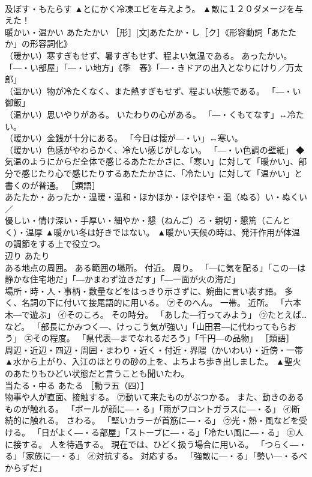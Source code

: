 \documentclass[8pt]{extreport}
\begin{document}
\begin{CJK}{UTF8}{min}
\\	及ぼす・もたらす	▲とにかく冷凍エビを与えよう。 ▲敵に１２０ダメージを与えた！
\\	暖かい・温かい	あたたかい	［形］[文]あたたか・し［ク］《形容動詞「あたたか」の形容詞化》 
\\	（暖かい）寒すぎもせず、暑すぎもせず、程よい気温である。 あったかい。 「―・い部屋」「―・い地方」《季　春》「―・きドアの出入となりにけり／万太郎」 
\\	（温かい）物が冷たくなく、また熱すぎもせず、程よい状態である。 「―・い御飯」 
\\	（温かい）思いやりがある。 いたわりの心がある。 「―・くもてなす」↔冷たい。 
\\	（暖かい）金銭が十分にある。 「今日は懐が―・い」↔寒い。 
\\	（暖かい）色感がやわらかく、冷たい感じがしない。 「―・い色調の壁紙」 ◆気温のようにからだ全体で感じるあたたかさに、「寒い」に対して「暖かい」、部分で感じたり心で感じたりするあたたかさに、「冷たい」に対して「温かい」と書くのが普通。 ［類語］
\\	あたたか・あったか・温暖・温和・ほかほか・ほやほや・温（ぬる）い・ぬくい／
\\	優しい・情け深い・手厚い・細やか・懇（ねんご）ろ・親切・懇篤（こんとく）・温厚	▲暖かい冬は好きではない。 ▲暖かい天候の時は、発汗作用が体温の調節をする上で役立つ。
\\	辺り	あたり	
\\	ある地点の周囲。 ある範囲の場所。 付近。 周り。 「―に気を配る」「この―は静かな住宅地だ」「―かまわず泣きだす」「―一面が火の海だ」 
\\	場所・時・人・事柄・数量などをはっきり示さずに、婉曲に言い表す語。 多く、名詞の下に付いて接尾語的に用いる。 ㋐そのへん。 一帯。 近所。 「六本木―で遊ぶ」 ㋑そのころ。 その時分。 「あした―行ってみよう」 ㋒たとえば…など。 「部長にかみつく―、けっこう気が強い」「山田君―に代わってもらおう」 ㋓その程度。 「県代表―までなれるだろう」「千円―の品物」 ［類語］
\\	周辺・近辺・四辺・周囲・まわり・近く・付近・界隈（かいわい）・近傍・一帯	▲水から上がり、入江のほとりの砂の上を、よちよち歩き出しました。 ▲聖火のあたりもひどい状態だと言うことも聞いたわ。
\\	当たる・中る	あたる	［動ラ五（四）］ 
\\	物事や人が直面、接触する。 ㋐動いて来たものがぶつかる。 また、動きのあるものが触れる。 「ボールが顔に―・る」「雨がフロントガラスに―・る」 ㋑断続的に触れる。 さわる。 「堅いカラーが首筋に―・る」 ㋒光・熱・風などを受ける。 「日がよく―・る部屋」「ストーブに―・る」「冷たい風に―・る」 ㋓人に接する。 人を待遇する。 現在では、ひどく扱う場合に用いる。 「つらく―・る」「家族に―・る」 ㋔対抗する。 対応する。 「強敵に―・る」「勢い―・るべからずだ」 

\end{CJK}
\end{document}
